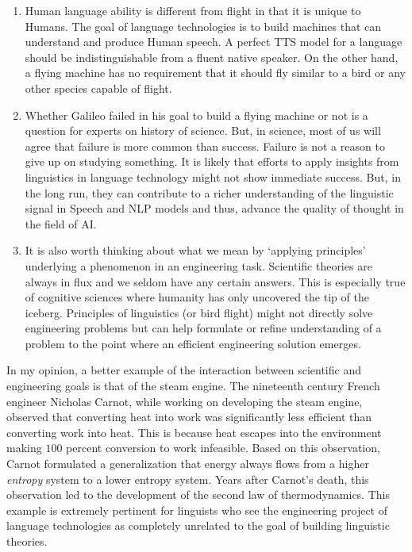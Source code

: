 \documentclass{article}
\begin{document}
\begin{enumerate}
    \item 
    Human language ability is different from flight in that it is unique to Humans. The goal of language technologies is to build machines that can understand and produce Human speech. A perfect TTS model for a language should be indistinguishable from a fluent native speaker. On the other hand, a flying machine has no requirement that it should fly similar to a bird or any other species capable of flight.
    
    \item Whether Galileo failed in his goal to build a flying machine or not is a question for experts on history of science. But, in science, most of us will agree that failure is more common than success. Failure is not a reason to give up on studying something. It is likely that efforts to apply insights from linguistics in language technology might not show immediate success. But, in the long run, they can contribute to a richer understanding of the linguistic signal in Speech and NLP models and thus, advance the quality of thought in the field of AI. 
    
    \item It is also worth thinking about what we mean by `applying principles' underlying a phenomenon in an engineering task. Scientific theories are always in flux and we seldom have any certain answers. This is especially true of cognitive sciences where humanity has only uncovered the tip of the iceberg. Principles of linguistics (or bird flight) might not directly solve engineering problems but can help formulate or refine understanding of a problem to the point where an efficient engineering solution emerges.
\end{enumerate}

In my opinion, a better example of the interaction between scientific and engineering goals is that of the steam engine. The nineteenth century French engineer Nicholas Carnot, while working on developing the steam engine, observed that converting heat into work was significantly less efficient than converting work into heat. This is because heat escapes into the environment making $100$ percent conversion to work infeasible. Based on this observation, Carnot formulated a generalization that energy always flows from a higher \textit{entropy} system to a lower entropy system. Years after Carnot's death, this observation led to the development of the second law of thermodynamics. This example is extremely pertinent for linguists who see the engineering project of language technologies as completely unrelated to the goal of building linguistic theories.
\end{document}
